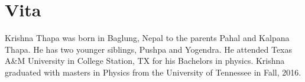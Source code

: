 \chapter*{Vita} \label{ch:vita}
Krishna Thapa was born in Baglung, Nepal to the parents Pahal and Kalpana Thapa. He has two younger siblings, Pushpa and Yogendra. He attended Texas A\&M University in College Station, TX for his Bachelors in physics. Krishna graduated with masters in Physics from the University of Tennessee in Fall, 2016.